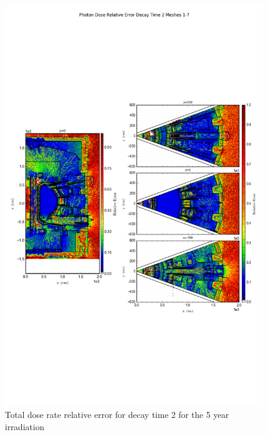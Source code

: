 \documentclass[12pt]{article}
\begin{document}
\begin{figure}[ht!]
\centering
\includegraphics[trim={0cm 8cm, 0cm 8cm},clip,scale=0.75]{../plots/final_model/5year/Photon_Dose_Relative_Error_Decay_Time_2_Meshes_1-7.png}
\caption{Total dose rate relative error for decay time 2 for the 5 year irradiation}
\label{fig:photons_5y_dc2_nob4c_relerr}
\end{figure}
\clearpage
\end{document}
